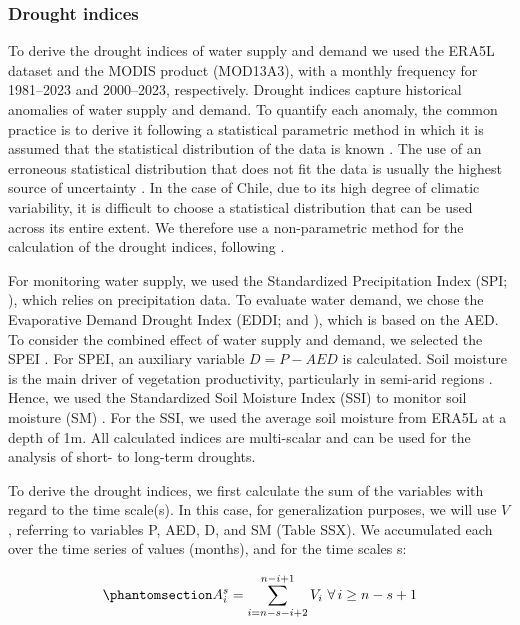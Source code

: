 \documentclass[
  sn-nature,
  numbered]{sn-jnl}
\begin{document}
\subsubsection{Drought indices}\label{drought-indices}

To derive the drought indices of water supply and demand we used the
ERA5L dataset and the MODIS product (MOD13A3\citep{Didan2015b}), with a
monthly frequency for 1981--2023 and 2000--2023, respectively. Drought
indices capture historical anomalies of water supply and demand. To
quantify each anomaly, the common practice is to derive it following a
statistical parametric method in which it is assumed that the
statistical distribution of the data is known \citep{Heim2002}. The use
of an erroneous statistical distribution that does not fit the data is
usually the highest source of uncertainty \citep{Laimighofer2022}. In
the case of Chile, due to its high degree of climatic variability, it is
difficult to choose a statistical distribution that can be used across
its entire extent. We therefore use a non-parametric method for the
calculation of the drought indices, following \citet{Farahmand2015}.

For monitoring water supply, we used the Standardized Precipitation
Index (SPI; \citet{McKee1993}), which relies on precipitation data. To
evaluate water demand, we chose the Evaporative Demand Drought Index
(EDDI; \citet{Hobbins2016} and \citet{McEvoy2016}), which is based on
the AED. To consider the combined effect of water supply and demand, we
selected the SPEI \citep{Vicente-Serrano2010}. For SPEI, an auxiliary
variable \(D=P−AED\) is calculated. Soil moisture is the main driver of
vegetation productivity, particularly in semi-arid regions
\citep{Li2022}. Hence, we used the Standardized Soil Moisture Index
(SSI) to monitor soil moisture (SM) \citep{Hao2013}. For the SSI, we
used the average soil moisture from ERA5L at a depth of 1m. All
calculated indices are multi-scalar and can be used for the analysis of
short- to long-term droughts.

To derive the drought indices, we first calculate the sum of the
variables with regard to the time scale(s). In this case, for
generalization purposes, we will use \(V\), referring to variables P,
AED, D, and SM (Table SSX). We accumulated each over the time series of
values (months), and for the time scales s:

\begin{equation}\phantomsection\label{eq-sumvar}{A^s_i = \sum_{i=n-s-i+2}^{n-i+1} V_i\,\, \forall\, i\geq n-s+1  }\end{equation}
\end{document}
